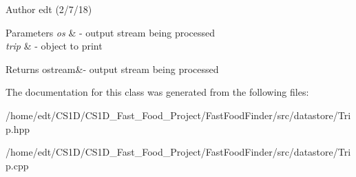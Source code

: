 \begin{DoxyAuthor}{Author}
edt (2/7/18)
\end{DoxyAuthor}

\begin{DoxyParams}{Parameters}
{\em os} & -\/ output stream being processed \\
\hline
{\em trip} & -\/ object to print\\
\hline
\end{DoxyParams}
\begin{DoxyReturn}{Returns}
ostream\&-\/ output stream being processed 
\end{DoxyReturn}


The documentation for this class was generated from the following files\-:\begin{DoxyCompactItemize}
\item 
/home/edt/\-C\-S1\-D/\-C\-S1\-D\-\_\-\-Fast\-\_\-\-Food\-\_\-\-Project/\-Fast\-Food\-Finder/src/datastore/Trip.\-hpp\item 
/home/edt/\-C\-S1\-D/\-C\-S1\-D\-\_\-\-Fast\-\_\-\-Food\-\_\-\-Project/\-Fast\-Food\-Finder/src/datastore/Trip.\-cpp\end{DoxyCompactItemize}
